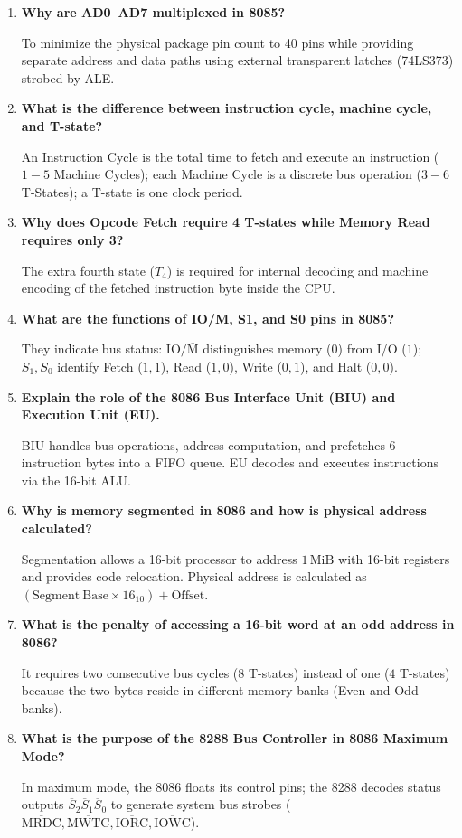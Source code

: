 \documentclass[12pt,a4paper]{article}
\newcommand{\Q}[1]{\textbf{#1}\par\noindent\ignorespaces}
\begin{document}
\begin{tcolorbox}[exambox, title={Frequently Asked / Viva Questions}]
\begin{enumerate}[leftmargin=*, label=\textbf{Q\arabic*.}, itemsep=3.5pt]
  \item \Q{Why are AD0--AD7 multiplexed in 8085?}
  To minimize the physical package pin count to 40 pins while providing separate address and data paths using external transparent latches (74LS373) strobed by ALE.
  \item \Q{What is the difference between instruction cycle, machine cycle, and T-state?}
  An Instruction Cycle is the total time to fetch and execute an instruction ($1-5$ Machine Cycles); each Machine Cycle is a discrete bus operation ($3-6$ T-States); a T-state is one clock period.
  \item \Q{Why does Opcode Fetch require 4 T-states while Memory Read requires only 3?}
  The extra fourth state ($T_4$) is required for internal decoding and machine encoding of the fetched instruction byte inside the CPU.
  \item \Q{What are the functions of IO/M, S1, and S0 pins in 8085?}
  They indicate bus status: $\mathrm{IO}/\overline{\mathrm{M}}$ distinguishes memory ($0$) from I/O ($1$); $S_1, S_0$ identify Fetch ($1,1$), Read ($1,0$), Write ($0,1$), and Halt ($0,0$).
  \item \Q{Explain the role of the 8086 Bus Interface Unit (BIU) and Execution Unit (EU).}
  BIU handles bus operations, address computation, and prefetches 6 instruction bytes into a FIFO queue. EU decodes and executes instructions via the 16-bit ALU.
  \item \Q{Why is memory segmented in 8086 and how is physical address calculated?}
  Segmentation allows a 16-bit processor to address $1\,\mathrm{MiB}$ with 16-bit registers and provides code relocation. Physical address is calculated as $(\mathrm{Segment\ Base} \times 16_{10}) + \mathrm{Offset}$.
  \item \Q{What is the penalty of accessing a 16-bit word at an odd address in 8086?}
  It requires two consecutive bus cycles ($8$ T-states) instead of one ($4$ T-states) because the two bytes reside in different memory banks (Even and Odd banks).
  \item \Q{What is the purpose of the 8288 Bus Controller in 8086 Maximum Mode?}
  In maximum mode, the 8086 floats its control pins; the 8288 decodes status outputs $\overline{S}_2\overline{S}_1\overline{S}_0$ to generate system bus strobes ($\overline{\mathrm{MRDC}}, \overline{\mathrm{MWTC}}, \overline{\mathrm{IORC}}, \overline{\mathrm{IOWC}}$).

\end{enumerate}
\end{tcolorbox}
\end{document}
